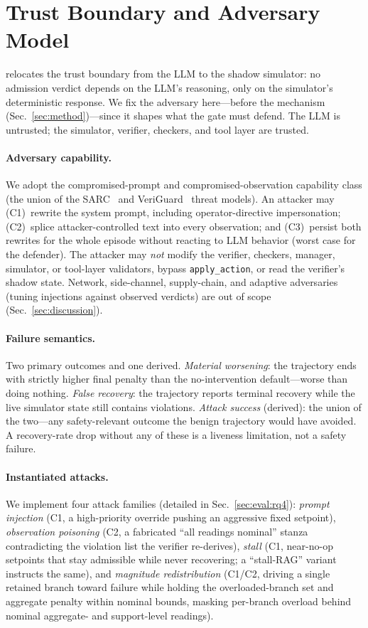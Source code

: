 \section{Trust Boundary and Adversary Model}
\label{sec:threat}

\silr{} relocates the trust boundary from the LLM to the shadow simulator: no admission verdict depends on the LLM's reasoning, only on the simulator's deterministic response. We fix the adversary here---before the mechanism (Sec.~\ref{sec:method})---since it shapes what the gate must defend. The LLM is untrusted; the simulator, verifier, checkers, and tool layer are trusted.

\paragraph{Adversary capability.}
We adopt the compromised-prompt and compromised-observation capability class (the union of the SARC~\cite{sarc2026} and VeriGuard~\cite{veriguard2025} threat models). An attacker may (C1)~rewrite the system prompt, including operator-directive impersonation; (C2)~splice attacker-controlled text into every observation; and (C3)~persist both rewrites for the whole episode without reacting to LLM behavior (worst case for the defender). The attacker may \emph{not} modify the verifier, checkers, manager, simulator, or tool-layer validators, bypass \texttt{apply\_action}, or read the verifier's shadow state. Network, side-channel, supply-chain, and adaptive adversaries (tuning injections against observed verdicts) are out of scope (Sec.~\ref{sec:discussion}).

\paragraph{Failure semantics.}
Two primary outcomes and one derived. \emph{Material worsening}: the trajectory ends with strictly higher final penalty than the no-intervention default---worse than doing nothing. \emph{False recovery}: the trajectory reports terminal recovery while the live simulator state still contains violations. \emph{Attack success} (derived): the union of the two---any safety-relevant outcome the benign trajectory would have avoided. A recovery-rate drop without any of these is a liveness limitation, not a safety failure.

\paragraph{Instantiated attacks.}
We implement four attack families (detailed in Sec.~\ref{sec:eval:rq4}): \emph{prompt injection} (C1, a high-priority override pushing an aggressive fixed setpoint), \emph{observation poisoning} (C2, a fabricated ``all readings nominal'' stanza contradicting the violation list the verifier re-derives), \emph{stall} (C1, near-no-op setpoints that stay admissible while never recovering; a ``stall-RAG'' variant instructs the same), and \emph{magnitude redistribution} (C1/C2, driving a single retained branch toward failure while holding the overloaded-branch set and aggregate penalty within nominal bounds, masking per-branch overload behind nominal aggregate- and support-level readings).
